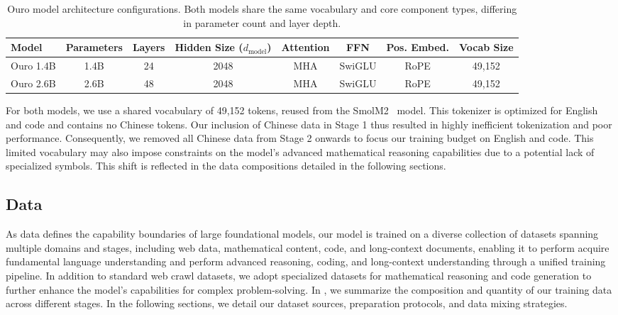 \documentclass[]{bytedance_seed}
\newcommand{\1}{\mathbf{1}}
\begin{document}
\begin{table}[htbp]
\centering
\caption{Ouro model architecture configurations. Both models share the same vocabulary and core component types, differing in parameter count and layer depth.}
\label{tab:model_architecture}
\small %
\begin{tabular}{@{}lccccccc@{}}
\toprule
\textbf{Model} & \textbf{Parameters} & \textbf{Layers} & \textbf{Hidden Size ($d_{\text{model}}$)} & \textbf{Attention} & \textbf{FFN} & \textbf{Pos. Embed.} & \textbf{Vocab Size} \\
\midrule
Ouro 1.4B & 1.4B & 24 & 2048 & MHA & SwiGLU & RoPE & 49,152 \\
Ouro 2.6B & 2.6B & 48 & 2048 & MHA & SwiGLU & RoPE & 49,152 \\
\bottomrule
\end{tabular}
\end{table}

For both models, we use a shared vocabulary of 49,152 tokens, reused from the SmolM2~\cite{allal2025smollm2} model. This tokenizer is optimized for English and code and contains no Chinese tokens. Our inclusion of Chinese data in Stage 1 thus resulted in highly inefficient tokenization and poor performance. Consequently, we removed all Chinese data from Stage 2 onwards to focus our training budget on English and code. This limited vocabulary may also impose constraints on the model's advanced mathematical reasoning capabilities due to a potential lack of specialized symbols. This shift is reflected in the data compositions detailed in the following sections.

\subsection{Data}
As data defines the capability boundaries of large foundational models, our model is trained on a diverse collection of datasets spanning multiple domains and stages, including web data, mathematical content, code, and long-context documents, enabling it to perform acquire fundamental language understanding and perform advanced reasoning, coding, and long-context understanding through a unified training pipeline. In addition to standard web crawl datasets, we adopt specialized datasets for mathematical reasoning and code generation to further enhance the model's capabilities for complex problem-solving. 
In , we summarize the composition and quantity of our training data across different stages.
In the following sections, we detail our dataset sources, preparation protocols, and data mixing strategies.
\end{document}
